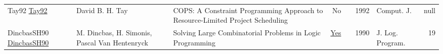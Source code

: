 {\begin{longtable}{p{3cm}p{6cm}p{7cm}rrrp{3cm}r}
Tay92 \href{}{Tay92} & David B. H. Tay & {COPS:} {A} Constraint Programming Approach to Resource-Limited Project Scheduling & No & \cite{Tay92} & 1992 & Comput. J. & null\\
DincbasSH90 \href{https://doi.org/10.1016/0743-1066(90)90052-7}{DincbasSH90} & M. Dincbas, H. Simonis, Pascal Van Hentenryck & Solving Large Combinatorial Problems in Logic Programming & \href{articles/DincbasSH90.pdf}{Yes} & \cite{DincbasSH90} & 1990 & J. Log. Program. & 19\\
\end{longtable}
}

